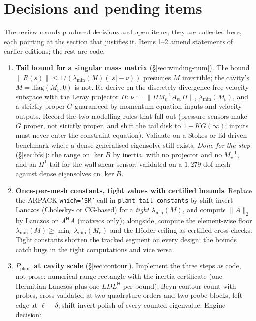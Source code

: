 \documentclass[11pt,a4paper]{article}
\newcommand{\code}[1]{\texttt{#1}}
\newcommand{\hp}{^{\mathsf H}}
\begin{document}
{\section{Decisions and pending items}
\label{sec:todo}

The review rounds produced decisions and open items; they are collected here, each
pointing at the section that justifies it.  Items 1--2 amend statements of earlier
editions; the rest are code.
\begin{enumerate}[leftmargin=1.8em,itemsep=2pt]
\item \textbf{Tail bound for a singular mass matrix} (\S\ref{sec:winding-num}).  The bound $\|R(s)\|\le1/(\lambda_{\min}(M)(|s|-\nu))$ presumes
$M$ invertible; the cavity's $M=\mathrm{diag}(M_v,0)$ is not.  Re-derive on the
discretely divergence-free velocity subspace with the Leray projector $\Pi$:
$\nu:=\|\Pi M_v^{-1}A_{vv}\Pi\|$, $\lambda_{\min}(M_v)$, and a strictly proper $G$
guaranteed by momentum-equation inputs and velocity outputs.  Record the two modelling
rules that fall out (pressure sensors make $G$ proper, not strictly proper, and shift the
tail disk to $1-KG(\infty)$; inputs must never enter the constraint equation).  Validate
on a Stokes or lid-driven benchmark where a dense generalised eigensolve still exists.
\emph{Done for the step} (\S\ref{sec:bfs}): the range on $\ker B$ by inertia, with no
projector and no $M_v^{-1}$, and an $H^1$ tail for the wall-shear sensor; validated on a
$1{,}279$-dof mesh against dense eigensolves on $\ker B$.
\item \textbf{Once-per-mesh constants, tight values with certified bounds}.  Replace the ARPACK \code{which='SM'} call in
\code{plant\_tail\_constants} by shift-invert Lanczos (Cholesky- or CG-based) for a
\emph{tight} $\lambda_{\min}(M)$, and compute $\|A\|_2$ by Lanczos on $A\hp A$ (matvecs
only); alongside, compute the element-wise floor
$\lambda_{\min}(M)\ge\min_e\lambda_{\min}(M_e)$ and the H\"older ceiling as certified
cross-checks.  Tight constants shorten the tracked segment on every design; the bounds
catch bugs in the tight computations and vice versa.
\item \textbf{$P_{\mathrm{plant}}$ at cavity scale} (\S\ref{sec:contour}).
Implement the three steps as code, not prose: numerical-range rectangle with the inertia
certificate (one Hermitian Lanczos plus one $LDL\hp$ per bound); Beyn contour count with
probes, cross-validated at two quadrature orders and two probe blocks, left edge at
$\ell-\delta$; shift-invert polish of every counted eigenvalue.  Engine decision:

\end{enumerate}}
\end{document}
